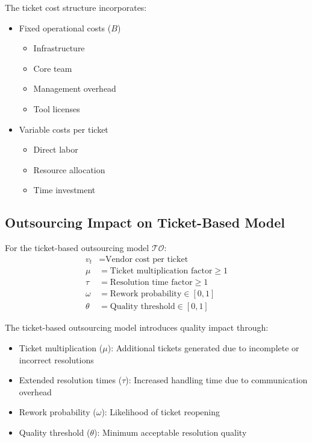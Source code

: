 \documentclass[12pt,a4paper]{article}
\newenvironment{definition}[1]
{\begin{mdframed}[style=definitionstyle,frametitle={Definition: #1}]}
{\end{mdframed}}
\newenvironment{explanation}
{\begin{mdframed}[style=explanationstyle,frametitle={Explanation}]}
{\end{mdframed}}
\begin{document}
\begin{explanation}
The ticket cost structure incorporates:
\begin{itemize}
    \item Fixed operational costs ($B$)
        \begin{itemize}
            \item Infrastructure
            \item Core team
            \item Management overhead
            \item Tool licenses
        \end{itemize}
    \item Variable costs per ticket
        \begin{itemize}
            \item Direct labor
            \item Resource allocation
            \item Time investment
        \end{itemize}
\end{itemize}
\end{explanation}

\subsection{Outsourcing Impact on Ticket-Based Model}
\begin{definition}{Ticket Outsourcing Variables}
For the ticket-based outsourcing model $\mathcal{TO}$:
\begin{align*}
    v_t &= \text{Vendor cost per ticket} \\
    \mu &= \text{Ticket multiplication factor} \geq 1 \\
    \tau &= \text{Resolution time factor} \geq 1 \\
    \omega &= \text{Rework probability} \in [0,1] \\
    \theta &= \text{Quality threshold} \in [0,1]
\end{align*}
\end{definition}

\begin{explanation}
The ticket-based outsourcing model introduces quality impact through:
\begin{itemize}
    \item Ticket multiplication ($\mu$): Additional tickets generated due to incomplete or incorrect resolutions
    \item Extended resolution times ($\tau$): Increased handling time due to communication overhead
    \item Rework probability ($\omega$): Likelihood of ticket reopening
    \item Quality threshold ($\theta$): Minimum acceptable resolution quality
\end{itemize}
\end{explanation}
\end{document}
